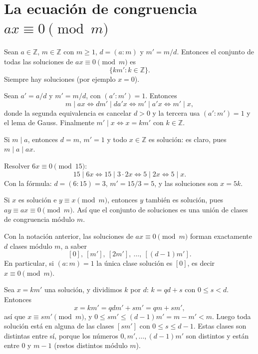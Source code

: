 \section{La ecuación de congruencia $ax\equiv 0 \pmod m$}

\begin{proposicion}
Sean $a\in\mathbb{Z}$, $m\in\mathbb{Z}$ con $m\ge 1$, $d=(a:m)$ y $m'=m/d$.
Entonces el conjunto de todas las soluciones de $ax\equiv 0 \pmod m$ es
\[
\{km' : k\in\mathbb{Z}\}.
\]
Siempre hay soluciones (por ejemplo $x=0$).
\end{proposicion}

\begin{demostracion}
Sean $a'=a/d$ y $m'=m/d$, con $(a':m')=1$. Entonces
\[
m\mid ax \iff dm'\mid da'x \iff m'\mid a'x \iff m'\mid x,
\]
donde la segunda equivalencia es cancelar $d>0$ y la tercera usa
$(a':m')=1$ y el lema de Gauss. Finalmente $m'\mid x\iff x=km'$ con
$k\in\mathbb{Z}$.
\end{demostracion}

\begin{nota}{}
Si $m\mid a$, entonces $d=m$, $m'=1$ y todo $x\in\mathbb{Z}$ es solución: es
claro, pues $m\mid a\mid ax$.
\end{nota}

\begin{ejemplo}
Resolver $6x\equiv 0 \pmod{15}$:
\[
15\mid 6x \iff 15\mid 3\cdot 2x \iff 5\mid 2x \iff 5\mid x.
\]
Con la fórmula: $d=(6:15)=3$, $m'=15/3=5$, y las soluciones son $x=5k$.
\end{ejemplo}

\begin{nota}{}
Si $x$ es solución e $y\equiv x \pmod m$, entonces $y$ también es solución, pues
$ay\equiv ax\equiv 0 \pmod m$. Así que el conjunto de soluciones es una unión
de clases de congruencia módulo $m$.
\end{nota}

\begin{proposicion}
Con la notación anterior, las soluciones de $ax\equiv 0 \pmod m$ forman
exactamente $d$ clases módulo $m$, a saber
\[
[0],\ [m'],\ [2m'],\ \dots,\ [(d-1)m'].
\]
En particular, si $(a:m)=1$ la única clase solución es $[0]$, es decir
$x\equiv 0 \pmod m$.
\end{proposicion}

\begin{demostracion}
Sea $x=km'$ una solución, y dividimos $k$ por $d$: $k=qd+s$ con $0\le s<d$.
Entonces
\[
x=km'=qdm'+sm'=qm+sm',
\]
así que $x\equiv sm' \pmod m$, y $0\le sm'\le (d-1)m'=m-m'<m$. Luego toda solución
está en alguna de las clases $[sm']$ con $0\le s\le d-1$. Estas clases son
distintas entre sí, porque los números $0,m',\dots,(d-1)m'$ son distintos y
están entre $0$ y $m-1$ (restos distintos módulo $m$).
\end{demostracion}

